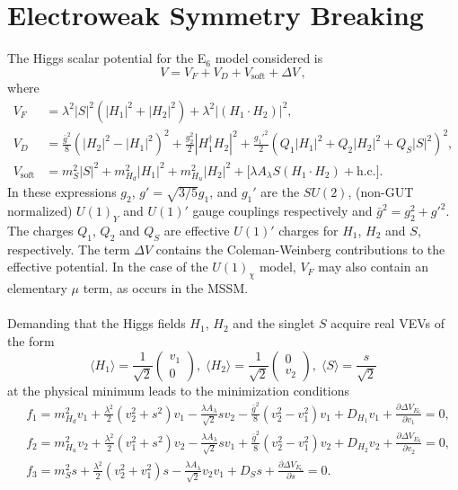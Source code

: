 \documentclass[preprint,amsmath,amssymb,aps,superscriptaddress,prd,showpacs,floatfix,nofootinbib]{revtex4-1}
\begin{document}
 



\section{\label{sec:ewsb}Electroweak Symmetry Breaking}
The Higgs scalar potential for the E$_6$ model considered is \cite{King:2005jy} 
\begin{equation}\label{eq:E6VeffOneLoop}
V=V_F+V_D+V_{\textrm{soft}}+\Delta V \, ,
\end{equation}
where
\begin{align}
V_F&=\lambda^2|S|^2(|H_1|^2+|H_2|^2)+\lambda^2|(H_1\cdot
H_2)|^2,\label{eq:E6VFterms}\\ V_D&=\frac{\bar{g}^2}{8}\left (
|H_2|^2-|H_1|^2\right )^2+\frac{g_2^2}{2}|H_1^\dagger
H_2|^2+\frac{g_1'^2}{2}(Q_1|H_1|^2+Q_2|H_2|^2+Q_S|S|^2)^2,\label{eq:E6VDterms}\\ V_{\textrm{soft}}&=m_S^2|S|^2+m_{H_d}^2|H_1|^2+m_{H_u}^2|H_2|^2+\Big
[\lambda A_\lambda S(H_1\cdot H_2)+\textrm{h.c.}\Big
].\label{eq:E6Vsoft}
\end{align}
In these expressions $g_2$, $g'=\sqrt{3/5}g_1$, and $g_1'$ are the
$SU(2)$, (non-GUT normalized) $U(1)_Y$ and $U(1)'$ gauge couplings
respectively and $\bar{g}^2=g_2^2+g'^2$. The charges $Q_1$,
$Q_2$ and $Q_S$ are effective $U(1)'$ charges for
$H_1$, $H_2$ and $S$, respectively. The term $\Delta V$ contains the
Coleman-Weinberg contributions to the effective potential. In the case
of the $U(1)_\chi$ model, $V_F$ may also contain an elementary
$\mu$ term, as occurs in the MSSM.\\ \\ Demanding that
the Higgs fields $H_1$, $H_2$ and the singlet $S$ acquire real VEVs of
the form
\begin{equation}\label{eq:E6vevs}
\langle H_1 \rangle = \frac{1}{\sqrt{2}}\begin{pmatrix} v_1 \\ 0\end{pmatrix}, \; \langle H_2 \rangle = \frac{1}{\sqrt{2}}\begin{pmatrix} 0 \\ v_2 \end{pmatrix}, \; \langle S \rangle =\frac{s}{\sqrt{2}}
\end{equation}
at the physical minimum leads to the minimization conditions
\begin{subequations}\label{eq:E6EWSBConditions}
\begin{align}
&f_1=m_{H_d}^2v_1+\frac{\lambda^2}{2}(v_2^2+s^2)v_1-\frac{\lambda A_\lambda}{\sqrt{2}}sv_2-\frac{\bar{g}^2}{8}
(v_2^2-v_1^2)v_1+D_{H_1}v_1+\frac{\partial \Delta V_{E_6}}{\partial v_1}=0,\label{eq:E6EWSBcondition1} \\
&f_2=m_{H_u}^2v_2+\frac{\lambda^2}{2}(v_1^2+s^2)v_2-\frac{\lambda A_\lambda}{\sqrt{2}}sv_1+\frac{\bar{g}^2}{8}
(v_2^2-v_1^2)v_2+D_{H_2}v_2+\frac{\partial \Delta V_{E_6}}{\partial v_2}=0,\label{eq:E6EWSBcondition2} \\
&f_3=m_S^2s+\frac{\lambda^2}{2}(v_2^2+v_1^2)s-\frac{\lambda A_\lambda}{\sqrt{2}}v_2v_1+D_Ss+\frac{\partial \Delta V_{E_6}}{\partial s}=0.\label{eq:E6EWSBcondition3}
\end{align}
\end{subequations}
\end{document}
